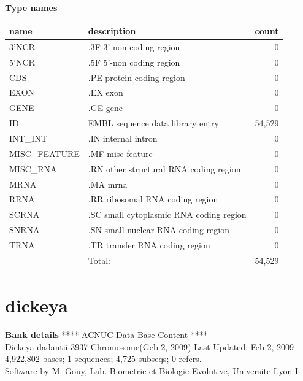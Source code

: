 \documentclass{article}
\begin{document}
\begin{Schunk}
\textbf{Type names}
\noindent\begin{tabular}{llr}
\hline \hline
name & description & count \\
\hline
3'NCR  &  .3F  3'-non coding region  &  0 \\
5'NCR  &  .5F  5'-non coding region  &  0 \\
CDS  &  .PE protein coding region  &  0 \\
EXON  &  .EX exon  &  0 \\
GENE  &  .GE gene  &  0 \\
ID  &  EMBL sequence data library entry  &  54,529 \\
INT\_INT  &  .IN  internal intron  &  0 \\
MISC\_FEATURE  &  .MF misc feature  &  0 \\
MISC\_RNA  &  .RN other structural RNA coding region  &  0 \\
MRNA  &  .MA mrna  &  0 \\
RRNA  &  .RR ribosomal RNA coding region  &  0 \\
SCRNA  &  .SC small cytoplasmic RNA coding region  &  0 \\
SNRNA  &  .SN small nuclear RNA coding region  &  0 \\
TRNA  &  .TR transfer RNA coding region  &  0 \\
\hline
 & Total: & 54,529 \\
\hline \hline
\end{tabular}

\section{ dickeya }
\textbf{Bank details}
             ****     ACNUC Data Base Content      ****                         \\
    Dickeya dadantii 3937 Chromosome(Geb 2, 2009) Last Updated: Feb  2, 2009\\
4,922,802 bases; 1 sequences; 4,725 subseqs; 0 refers.\\
Software by M. Gouy, Lab. Biometrie et Biologie Evolutive, Universite Lyon I 


\end{Schunk}
\end{document}
